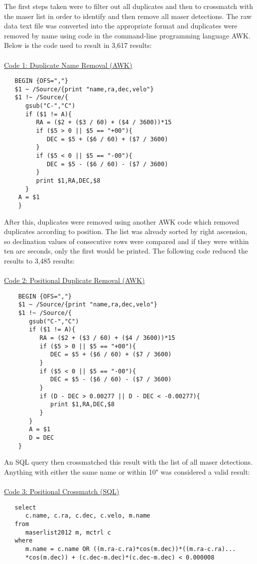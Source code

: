 \documentclass[12pt]{article}
\begin{document}
The first steps taken were to filter out all duplicates and then to crossmatch with the maser list in order to identify and then remove all maser detections. The raw data text file was converted into the appropriate format and duplicates were removed by name using code in the command-line programming language AWK. Below is the code used to result in 3,617 results:\\
\\
\underline{Code 1: Duplicate Name Removal (AWK)}
\begin{verbatim}
   BEGIN {OFS=","}
   $1 ~ /Source/{print "name,ra,dec,velo"}
   $1 !~ /Source/{
      gsub("C-","C")
      if ($1 != A){
         RA = ($2 + ($3 / 60) + ($4 / 3600))*15
         if ($5 > 0 || $5 == "+00"){
            DEC = $5 + ($6 / 60) + ($7 / 3600)
         }
         if ($5 < 0 || $5 == "-00"){
            DEC = $5 - ($6 / 60) - ($7 / 3600)
         }
         print $1,RA,DEC,$8
      }
    A = $1
    }
\end{verbatim}

After this, duplicates were removed using another AWK code which removed duplicates according to position. The list was already sorted by right ascension, so declination values of consecutive rows were compared and if they were within ten arc seconds, only the first would be printed. The following code reduced the results to 3,485 results: \\
\\
\underline{Code 2: Positional Duplicate Removal (AWK)}
\begin{verbatim}    BEGIN {OFS=","}
    $1 ~ /Source/{print "name,ra,dec,velo"}
    $1 !~ /Source/{
       gsub("C-","C")
       if ($1 != A){
          RA = ($2 + ($3 / 60) + ($4 / 3600))*15
          if ($5 > 0 || $5 == "+00"){
             DEC = $5 + ($6 / 60) + ($7 / 3600)
          }
          if ($5 < 0 || $5 == "-00"){
             DEC = $5 - ($6 / 60) - ($7 / 3600)
          }
          if (D - DEC > 0.00277 || D - DEC < -0.00277){
             print $1,RA,DEC,$8
          }
       }
       A = $1
       D = DEC
    }
\end{verbatim}

An SQL query then crossmatched this result with the list of all maser detections. Anything with either the same name or within 10" was considered a valid result: \\
\\
\underline{Code 3: Positional Crossmatch (SQL)}
\begin{verbatim}   select
      c.name, c.ra, c.dec, c.velo, m.name
   from
      maserlist2012 m, mctrl c
   where
      m.name = c.name OR ((m.ra-c.ra)*cos(m.dec))*((m.ra-c.ra)...
      *cos(m.dec)) + (c.dec-m.dec)*(c.dec-m.dec) < 0.000008
\end{verbatim}
\end{document}
